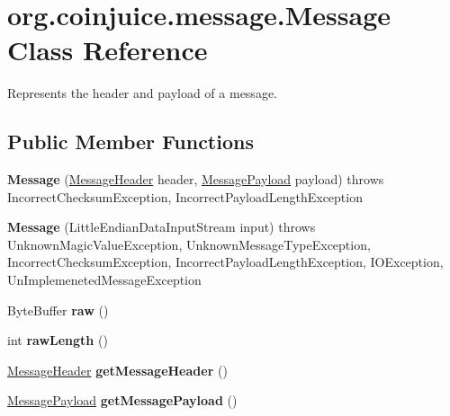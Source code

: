 \hypertarget{classorg_1_1coinjuice_1_1message_1_1_message}{\section{org.\-coinjuice.\-message.\-Message Class Reference}
\label{classorg_1_1coinjuice_1_1message_1_1_message}
}


Represents the header and payload of a message.  


\subsection*{Public Member Functions}
\begin{DoxyCompactItemize}
\item 
\hypertarget{classorg_1_1coinjuice_1_1message_1_1_message_a15f4f9d63a8fce26f1c1135265227dfa}{{\bfseries Message} (\hyperlink{classorg_1_1coinjuice_1_1message_1_1_message_header}{Message\-Header} header, \hyperlink{classorg_1_1coinjuice_1_1message_1_1_message_payload}{Message\-Payload} payload)  throws Incorrect\-Checksum\-Exception, Incorrect\-Payload\-Length\-Exception }\label{classorg_1_1coinjuice_1_1message_1_1_message_a15f4f9d63a8fce26f1c1135265227dfa}

\item 
\hypertarget{classorg_1_1coinjuice_1_1message_1_1_message_ab7960c708b3d8432b17516d4ef3e3a20}{{\bfseries Message} (Little\-Endian\-Data\-Input\-Stream input)  throws Unknown\-Magic\-Value\-Exception, Unknown\-Message\-Type\-Exception, Incorrect\-Checksum\-Exception, Incorrect\-Payload\-Length\-Exception, I\-O\-Exception, Un\-Implemeneted\-Message\-Exception }\label{classorg_1_1coinjuice_1_1message_1_1_message_ab7960c708b3d8432b17516d4ef3e3a20}

\item 
\hypertarget{classorg_1_1coinjuice_1_1message_1_1_message_a5af81e3a5236d946fd35ee3211139fd1}{Byte\-Buffer {\bfseries raw} ()}\label{classorg_1_1coinjuice_1_1message_1_1_message_a5af81e3a5236d946fd35ee3211139fd1}

\item 
\hypertarget{classorg_1_1coinjuice_1_1message_1_1_message_a30743df9064d4238d7e4474d1aaf225a}{int {\bfseries raw\-Length} ()}\label{classorg_1_1coinjuice_1_1message_1_1_message_a30743df9064d4238d7e4474d1aaf225a}

\item 
\hypertarget{classorg_1_1coinjuice_1_1message_1_1_message_a7bc430f4cf122dc93fc08842af807093}{\hyperlink{classorg_1_1coinjuice_1_1message_1_1_message_header}{Message\-Header} {\bfseries get\-Message\-Header} ()}\label{classorg_1_1coinjuice_1_1message_1_1_message_a7bc430f4cf122dc93fc08842af807093}

\item 
\hypertarget{classorg_1_1coinjuice_1_1message_1_1_message_af6dbe71eb471251fbfd88cd88fc3df01}{\hyperlink{classorg_1_1coinjuice_1_1message_1_1_message_payload}{Message\-Payload} {\bfseries get\-Message\-Payload} ()}\label{classorg_1_1coinjuice_1_1message_1_1_message_af6dbe71eb471251fbfd88cd88fc3df01}

\end{DoxyCompactItemize}
